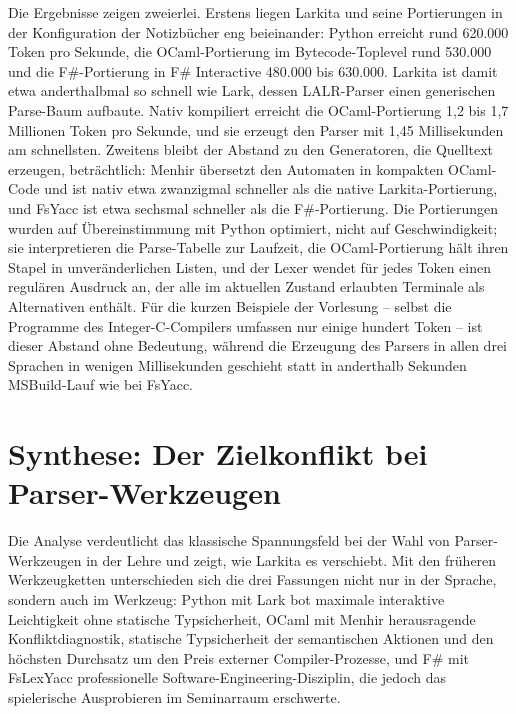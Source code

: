 Die Ergebnisse zeigen zweierlei.
Erstens liegen Larkita und seine Portierungen in der Konfiguration der Notizbücher eng beieinander: Python erreicht rund 620.000 Token pro Sekunde, die OCaml-Portierung im Bytecode-Toplevel rund 530.000 und die F\#-Portierung in F\# Interactive 480.000 bis 630.000.
Larkita ist damit etwa anderthalbmal so schnell wie Lark, dessen LALR-Parser einen generischen Parse-Baum aufbaute.
Nativ kompiliert erreicht die OCaml-Portierung 1,2 bis 1,7 Millionen Token pro Sekunde, und sie erzeugt den Parser mit 1,45 Millisekunden am schnellsten.
Zweitens bleibt der Abstand zu den Generatoren, die Quelltext erzeugen, beträchtlich: Menhir übersetzt den Automaten in kompakten OCaml-Code und ist nativ etwa zwanzigmal schneller als die native Larkita-Portierung, und FsYacc ist etwa sechsmal schneller als die F\#-Portierung.
Die Portierungen wurden auf Übereinstimmung mit Python optimiert, nicht auf Geschwindigkeit; sie interpretieren die Parse-Tabelle zur Laufzeit, die OCaml-Portierung hält ihren Stapel in unveränderlichen Listen, und der Lexer wendet für jedes Token einen regulären Ausdruck an, der alle im aktuellen Zustand erlaubten Terminale als Alternativen enthält.
Für die kurzen Beispiele der Vorlesung -- selbst die Programme des Integer-C-Compilers umfassen nur einige hundert Token -- ist dieser Abstand ohne Bedeutung, während die Erzeugung des Parsers in allen drei Sprachen in wenigen Millisekunden geschieht statt in anderthalb Sekunden MSBuild-Lauf wie bei FsYacc.

\section{Synthese: Der Zielkonflikt bei Parser-Werkzeugen}
\label{sec:toolchain_synthesis}

Die Analyse verdeutlicht das klassische Spannungsfeld bei der Wahl von Parser-Werkzeugen in der Lehre und zeigt, wie Larkita es verschiebt.
Mit den früheren Werkzeugketten unterschieden sich die drei Fassungen nicht nur in der Sprache, sondern auch im Werkzeug: Python mit Lark bot maximale interaktive Leichtigkeit ohne statische Typsicherheit, OCaml mit Menhir herausragende Konfliktdiagnostik, statische Typsicherheit der semantischen Aktionen und den höchsten Durchsatz um den Preis externer Compiler-Prozesse, und F\# mit FsLexYacc professionelle Software-Engineering-Disziplin, die jedoch das spielerische Ausprobieren im Seminarraum erschwerte.

